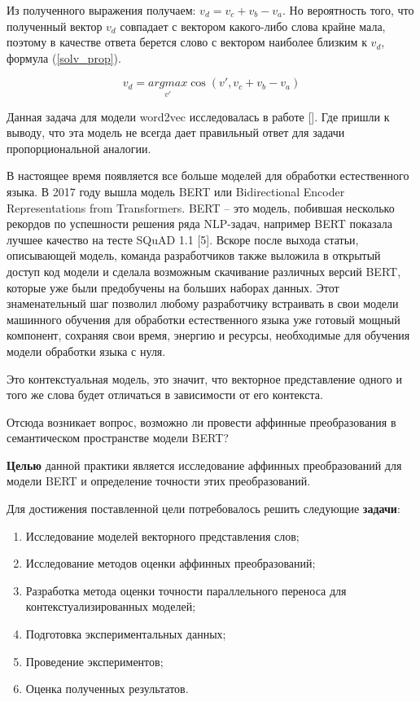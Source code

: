 \documentclass[a4paper,14pt]{article}
\begin{document}
Из полученного выражения получаем: $v_d = v_c + v_b - v_a$.
Но вероятность того, что полученный вектор $v_d$ совпадает с вектором какого-либо слова крайне мала, поэтому в качестве ответа берется слово с вектором наиболее близким к $v_d$, формула (\ref{solv_prop}).

\begin{equation}
	v_d = \underset{v'}{argmax} \cos (v', v_c + v_b - v_a)
	\label{solv_prop}
\end{equation}

Данная задача для модели word2vec исследовалась в работе []. Где пришли к выводу, что эта модель не всегда дает правильный ответ для задачи пропорциональной аналогии.

В настоящее время появляется все больше моделей для обработки естественного языка.
В 2017 году вышла модель BERT или Bidirectional Encoder Representations from Transformers.
BERT – это модель, побившая несколько рекордов по успешности решения ряда NLP-задач, например BERT показала лучшее качество на тесте SQuAD 1.1 [5].
Вскоре после выхода статьи, описывающей модель, команда разработчиков также выложила в открытый доступ код модели и сделала возможным скачивание различных версий BERT, которые уже были предобучены на больших наборах данных.
Этот знаменательный шаг позволил любому разработчику встраивать в свои модели машинного обучения для обработки естественного языка уже готовый мощный компонент, сохраняя свои время, энергию и ресурсы, необходимые для обучения модели обработки языка с нуля.

Это контекстуальная модель, это значит, что векторное представление одного и того же слова будет отличаться в зависимости от его контекста.

Отсюда возникает вопрос, возможно ли провести аффинные преобразования в семантическом пространстве модели BERT?

\textbf{Целью} данной практики является исследование аффинных преобразований для модели BERT и определение точности этих преобразований.

Для достижения поставленной цели потребовалось решить следующие \textbf{задачи}:

\begin{enumerate}
	
\item Исследование моделей векторного представления слов;
 
\item Исследование методов оценки аффинных преобразований;

\item Разработка метода оценки точности параллельного переноса для контекстуализированных моделей;

\item Подготовка экспериментальных данных;

\item Проведение экспериментов;

\item Оценка полученных результатов.


\end{enumerate}
\end{document}
